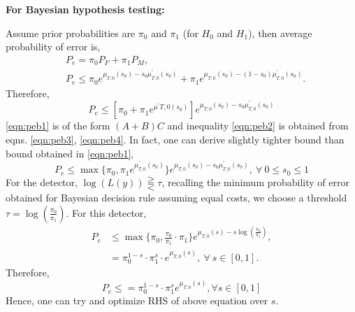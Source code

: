 \documentclass[a4paper,english,12pt]{article}
\begin{document}
\begin{exmp}\textbf{For Bayesian hypothesis testing:}
\par Assume prior probabilities are $\pi_0$ and $\pi_1$ (for $H_0$ and $H_1$), then average probability of error is,
\begin{align}\label{eqn:peb2}
&P_e=\pi_0P_F+\pi_1P_M,\nonumber\\
&P_e\leq\pi_0 e^{\mu_{T,0}(s_0)-s_0 \mu^\prime_{T,0}(s_0)}+\pi_1 e^{\mu_{T,0}(s_0)-(1-s_0) \mu^\prime_{T,0}(s_0)}.
\end{align}
Therefore,
\begin{equation}\label{eqn:peb1}
P_e\leq[\pi_0+\pi_1 e^{\mu^\prime{T,0}(s_0)}] e^{\mu_{T,0}(s_0)-s_0\mu^\prime_{T,0}(s_0)}
 \end{equation}
\eqref{eqn:peb1} is of the form $(A+B)C$ and inequality \eqref{eqn:peb2} is obtained from eqns. \eqref{eqn:peb3}, \eqref{eqn:peb4}. In fact, one can derive slightly tighter bound than bound obtained in \eqref{eqn:peb1},
\begin{equation}
P_e\leq \max\{\pi_0,\pi_1 e^{\mu^\prime_{T,0}(s_0)}\} e^{\mu_{T,0}(s_0)-s_0\mu^\prime_{T,0}(s_0)},~\forall~0\leq s_0\leq 1
\end{equation}
For the detector, $\log(L(y))\gtreqqless\tau$, recalling the minimum probability of error obtained for Bayesian decision rule assuming equal costs, we choose a threshold $\tau=\log\left(\frac{\pi_0}{\pi_1}\right)$. For this detector,
\begin{align*}
P_e&\leq\max\{\pi_0,\frac{\pi_0}{\pi_1}\cdot \pi_1\} e^{\mu_{T,0}(s)-s \log\left(\frac{\pi_0}{\pi_1}\right)},\\
&=\pi_0^{1-s}\cdot \pi_1^s\cdot e^{\mu_{T,0}(s)},~\forall~s\in [0,1].
\end{align*}
Therefore,
\begin{equation}
P_e\leq =\pi_0^{1-s}\cdot \pi_1^s e^{\mu_{T,0}(s)},\forall s\in [0,1]
\end{equation}
Hence, one can try and optimize RHS of above equation over $s$.
\end{exmp}
\end{document}
